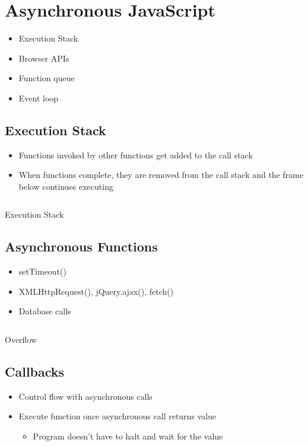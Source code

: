 \section{Asynchronous JavaScript}
\begin{itemize}
	\item Execution Stack
	\item Browser APIs
	\item Function queue
	\item Event loop
\end{itemize}

\subsection{Execution Stack}
\begin{itemize}
	\item Functions invoked by other functions get added to the call stack
	\item When functions complete, they are removed from the call stack and
	      the frame below continues executing
\end{itemize}

\begin{code}
	\inputminted{js}{src1/6-stack.js}
	\caption{Execution Stack}
\end{code}

\subsection{Asynchronous Functions}
\begin{itemize}
	\item setTimeout()
	\item XMLHttpRequest(), jQuery.ajax(), fetch()
	\item Database calls
\end{itemize}

\begin{code}
	\inputminted{js}{src1/7-overflow.js}
	\caption{Overflow}
\end{code}

\subsection{Callbacks}
\begin{itemize}
	\item Control flow with asynchronous calls
	\item Execute function once asynchronous call returns value
	      \begin{itemize}
		      \item Program doesn't have to halt and wait for the value
	      \end{itemize}
\end{itemize}

